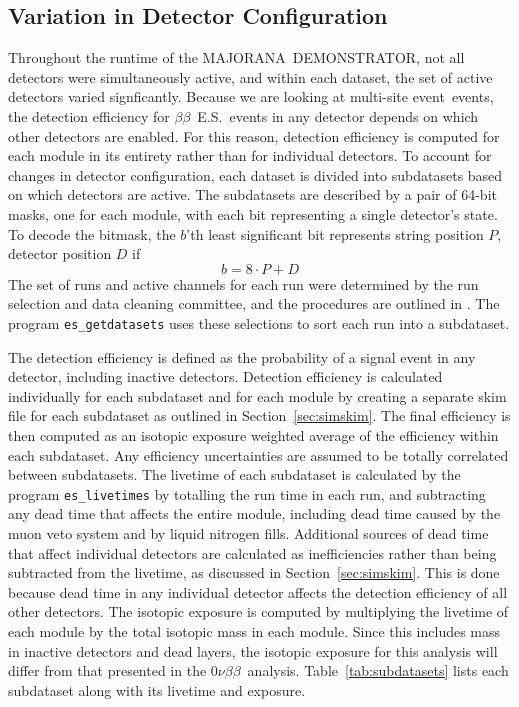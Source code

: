 \documentclass[notitlepage,rmp,aps,10pt]{revtex4-1}
\newcommand{\MJ}{M{\footnotesize AJORANA}}
\newcommand{\Demo}{D{\footnotesize EMON\-STRAT\-OR}}
\newcommand{\MJD}{\MJ\ \Demo}
\newcommand{\bb}{${\beta \beta}$}
\newcommand{\znbb}{${0 \nu \beta \beta}$}
\newcommand{\bbes}{\bb~E.S.}
\newcommand{\msmd}{multi-site event}
\begin{document}
\subsection{Variation in Detector Configuration} \label{sec:sds}
Throughout the runtime of the \MJD, not all detectors were simultaneously active, and within each dataset, the set of active detectors varied signficantly.
Because we are looking at \msmd\ events, the detection efficiency for \bbes\ events in any detector depends on which other detectors are enabled.
For this reason, detection efficiency is computed for each module in its entirety rather than for individual detectors.
To account for changes in detector configuration, each dataset is divided into subdatasets based on which detectors are active.
The subdatasets are described by a pair of 64-bit masks, one for each module, with each bit representing a single detector's state.
To decode the bitmask, the $b$'th least significant bit represents string position $P$, detector position $D$ if
\begin{equation}\label{eq:sdsbitmask}
  b = 8\cdot P + D
\end{equation}
The set of runs and active channels for each run were determined by the run selection and data cleaning committee, and the procedures are outlined in \cite{2018Reine}.
The program \texttt{es\_getdatasets} uses these selections to sort each run into a subdataset.

The detection efficiency is defined as the probability of a signal event in any detector, including inactive detectors.
Detection efficiency is calculated individually for each subdataset and for each module by creating a separate skim file for each subdataset as outlined in Section~\ref{sec:simskim}.
The final efficiency is then computed as an isotopic exposure weighted average of the efficiency within each subdataset.
Any efficiency uncertainties are assumed to be totally correlated between subdatasets.
The livetime of each subdataset is calculated by the program \texttt{es\_livetimes} by totalling the run time in each run, and subtracting any dead time that affects the entire module, including dead time caused by the muon veto system and by liquid nitrogen fills.
Additional sources of dead time that affect individual detectors are calculated as inefficiencies rather than being subtracted from the livetime, as discussed in Section~\ref{sec:simskim}.
This is done because dead time in any individual detector affects the detection efficiency of all other detectors.
The isotopic exposure is computed by multiplying the livetime of each module by the total isotopic mass in each module.
Since this includes mass in inactive detectors and dead layers, the isotopic exposure for this analysis will differ from that presented in the \znbb\ analysis.
Table~\ref{tab:subdatasets} lists each subdataset along with its livetime and exposure.
\end{document}

